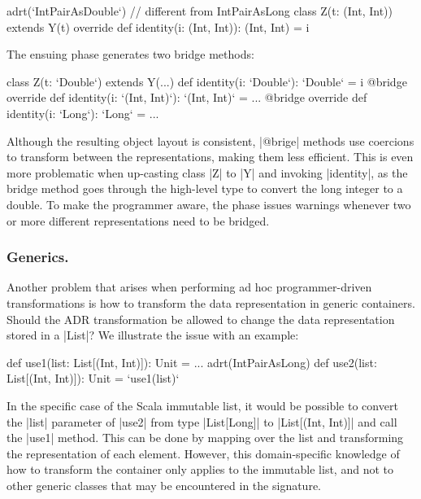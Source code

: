\begin{lstlisting-nobreak}
adrt(`IntPairAsDouble`) { // different from IntPairAsLong
  class Z(t: (Int, Int)) extends Y(t) {
    override def identity(i: (Int, Int)): (Int, Int) = i
  }
}
\end{lstlisting-nobreak}

The ensuing \bridge{} phase generates two bridge methods: %

\begin{lstlisting-nobreak}
class Z(t: `Double`) extends Y(...) {
  def identity(i: `Double`): `Double` = i
  @bridge override def identity(i: `(Int, Int)`): `(Int, Int)` = ...
  @bridge override def identity(i: `Long`): `Long` = ...
}
\end{lstlisting-nobreak}


Although the resulting object layout is consistent, |@brige| methods use coercions to transform between the representations, making them less efficient. This is even more problematic when up-casting class |Z| to |Y| and invoking |identity|, as the bridge method goes through the high-level type to convert the long integer to a double. To make the programmer aware, the \bridge{} phase issues warnings whenever two or more different representations need to be bridged.

\subsubsection{Generics.}
Another problem that arises when performing ad hoc programmer-driven transformations is how to transform the data representation in generic containers. Should the ADR transformation be allowed to change the data representation stored in a |List|? We illustrate the issue with an example:

\begin{lstlisting-nobreak}
def use1(list: List[(Int, Int)]): Unit = ...
adrt(IntPairAsLong) {
  def use2(list: List[(Int, Int)]): Unit = `use1(list)`
}
\end{lstlisting-nobreak}

In the specific case of the Scala immutable list, it would be possible to convert the |list| parameter of |use2| from type |List[Long]| to |List[(Int, Int)]| and call the |use1| method. This can be done by mapping over the list and transforming the representation of each element. However, this domain-specific knowledge of how to transform the container only applies to the immutable list, and not to other generic classes that may be encountered in the signature.

